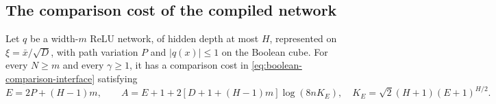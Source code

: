 \subsection{The comparison cost of the compiled network}
\begin{lemma}
\label{lem:boolean-path-Gaussian}
Let $q$ be a width-$m$ ReLU network, of hidden depth at most $H$, represented on $\xi=\bar x/\sqrt D$, with path variation $P$ and $|q(x)|\le1$ on the Boolean cube. For every $N\ge m$ and every $\gamma\ge1$, it has a comparison cost in \eqref{eq:boolean-comparison-interface} satisfying
\begin{equation}
 E=2P+(H-1)m,\qquad
 A=E+1+2[D+1+(H-1)m]\log(8nK_E),
 \quad K_E=\sqrt2(H+1)(E+1)^{H/2}.
 \label{eq:boolean-selective-cost}
\end{equation}
\end{lemma}
